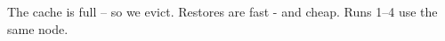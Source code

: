 \documentclass{article}
\begin{document}
The cache is full -- so we evict.
Restores are fast - and cheap.
Runs 1--4 use the same node.
\end{document}

